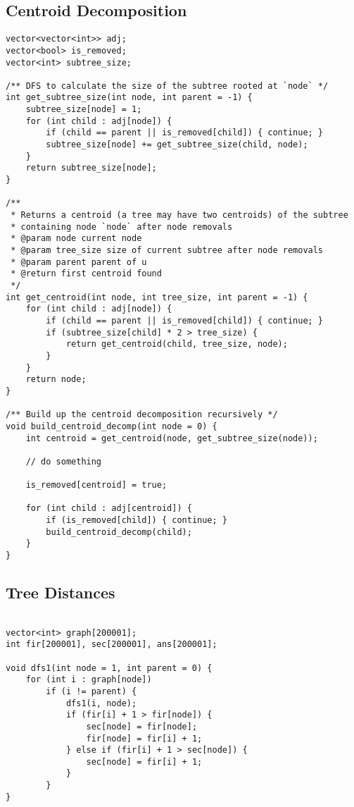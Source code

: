 \documentclass[10pt]{article}
\begin{document}
\begin{multicols*}{2}
\subsection{Centroid Decomposition}

\begin{lstlisting}[style=compactcpp]
	vector<vector<int>> adj;
vector<bool> is_removed;
vector<int> subtree_size;

/** DFS to calculate the size of the subtree rooted at `node` */
int get_subtree_size(int node, int parent = -1) {
	subtree_size[node] = 1;
	for (int child : adj[node]) {
		if (child == parent || is_removed[child]) { continue; }
		subtree_size[node] += get_subtree_size(child, node);
	}
	return subtree_size[node];
}

/**
 * Returns a centroid (a tree may have two centroids) of the subtree
 * containing node `node` after node removals
 * @param node current node
 * @param tree_size size of current subtree after node removals
 * @param parent parent of u
 * @return first centroid found
 */
int get_centroid(int node, int tree_size, int parent = -1) {
	for (int child : adj[node]) {
		if (child == parent || is_removed[child]) { continue; }
		if (subtree_size[child] * 2 > tree_size) {
			return get_centroid(child, tree_size, node);
		}
	}
	return node;
}

/** Build up the centroid decomposition recursively */
void build_centroid_decomp(int node = 0) {
	int centroid = get_centroid(node, get_subtree_size(node));

	// do something

	is_removed[centroid] = true;

	for (int child : adj[centroid]) {
		if (is_removed[child]) { continue; }
		build_centroid_decomp(child);
	}
}

\end{lstlisting}

\subsection{Tree Distances}

\begin{lstlisting}[style=compactcpp]
	
vector<int> graph[200001];
int fir[200001], sec[200001], ans[200001];

void dfs1(int node = 1, int parent = 0) {
	for (int i : graph[node])
		if (i != parent) {
			dfs1(i, node);
			if (fir[i] + 1 > fir[node]) {
				sec[node] = fir[node];
				fir[node] = fir[i] + 1;
			} else if (fir[i] + 1 > sec[node]) {
				sec[node] = fir[i] + 1;
			}
		}
}


\end{lstlisting}
\end{multicols*}
\end{document}
